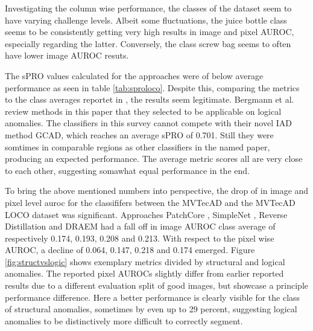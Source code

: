 

Investigating the column wise performance, the classes of the dataset seem to have varying challenge levels. Albeit some fluctuations, 
the juice bottle class seems to be consistently getting very high results in image and pixel AUROC, especially regarding the latter. 
Conversely, the class screw bag seems to often have lower image AUROC resuts.




The sPRO values calculated for the approaches were of below average performance as seen in table \ref{tab:sproloco}. Despite this, comparing the metrics to the 
class averages reportet in \cite{LOCODentsAndScratchesBergmann2022}, the results seem legitimate. Bergmann et al. review methods 
in this paper that they selected to be applicable on logical anomalies. The classifiers in this survey cannot compete with their novel IAD method GCAD, which reaches an 
average sPRO of 0.701. Still they were somtimes in comparable regions as other classifiers in the named paper, producing an expected performance. 
The average metric scores all are very close to each other, suggesting somawhat equal performance in the end.





To bring the above mentioned numbers into perspective, the drop of in image and pixel level auroc for the classififers between the 
MVTecAD \cite{MVTEC_Bergmann_2021} and the MVTecAD LOCO \cite{LOCODentsAndScratchesBergmann2022} dataset was significant. Approaches 
PatchCore \cite{patchCore2022}, SimpleNet \cite{liu2023simplenet}, Reverse Distillation \cite{revdist2023} and DRAEM \cite{Zavrtanik_2021DRAEM} had a fall off 
in image AUROC class average of respectively 0.174, 0.193, 0.208 and 0.213. With respect to the pixel wise 
AUROC, a decline of 0.064, 0.147, 0.218 and 0.174 emerged. \newline
Figure \ref{fig:structvslogic} shows exemplary metrics divided by structural and logical anomalies. The reported pixel AUROCs slightly differ from earlier reported results due to a different 
evaluation split of good images, but showcase a principle performance difference. Here a better performance is clearly visible for the 
class of structural anomalies, sometimes by even up to 29 percent, suggesting logical anomalies to be distinctively more difficult to correctly segment.

